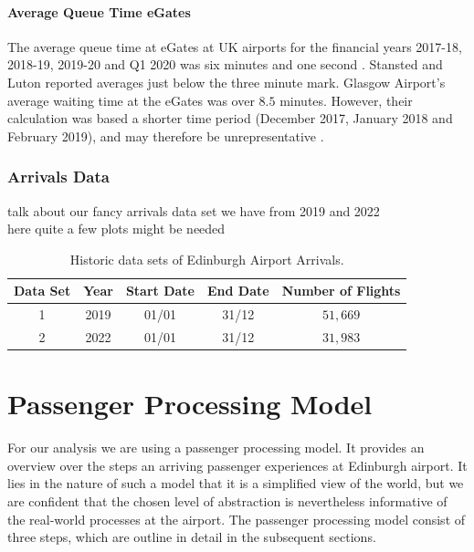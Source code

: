 \documentclass[10pt]{article}
\begin{document}
\paragraph{Average Queue Time eGates}
The average queue time at eGates at UK airports for the financial years 2017-18, 2018-19, 2019-20 and Q1 2020 was six minutes and one second \cite{Inspection_eGates}. Stansted and Luton reported averages just below the three minute mark. Glasgow Airport's average waiting time at the eGates was over $8.5$ minutes. However, their calculation was based a shorter time period (December 2017, January 2018 and February 2019), and may therefore be unrepresentative \cite{Inspection_eGates}.


\subsubsection{Arrivals Data}
talk about our fancy arrivals data set we have from 2019 and 2022 \\
here quite a few plots might be needed 


\begin{table}[!ht]
\caption{Historic data sets of Edinburgh Airport Arrivals.}
\label{tab_comdat_overview}
\centering
\begin{tabular}{ccccc}
\hline
\multicolumn{1}{c}{\textbf{Data Set}} & \textbf{Year} & \textbf{Start Date} & \textbf{End Date} & \textbf{Number of Flights} \\ \hline
1  & 2019  & 01/01  & 31/12    &  $51,669$  \\
2  & 2022  & 01/01  & 31/12    &  $31,983$  \\
 \hline
\end{tabular}
\end{table}


\section{Passenger Processing Model}

For our analysis we are using a passenger processing model. It provides an overview over the steps an arriving passenger experiences at Edinburgh airport. It lies in the nature of such a model that it is a simplified view of the world, but we are confident that the chosen level of abstraction is nevertheless informative of the real-world processes at the airport. The passenger processing model consist of three steps, which are outline in detail in the subsequent sections.
\end{document}
